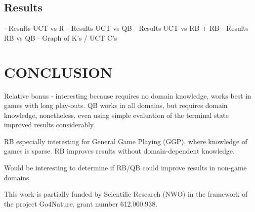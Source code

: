 \documentclass{ecai2014}
\begin{document}
\subsection{Results}
\label{subsec:results}
- Results UCT vs R
- Results UCT vs QB
- Results UCT vs RB + RB
- Results RB vs QB
- Graph of K's / UCT C's

\section{CONCLUSION}
Relative bonus - interesting because requires no domain knowledge, works best in games with long play-outs.
QB works in all domains, but requires domain knowledge, nonetheless, even using simple evaluation of the terminal state improved results considerably.

RB especially interesting for General Game Playing (GGP), where knowledge of games is sparse. RB improves results without domain-dependent knowledge.

Would be interesting to determine if RB/QB could improve results in non-game domains.

\ack This work is partially funded by Scientific Research (NWO) in the framework of the project Go4Nature, grant number 612.000.938.


\end{document}
